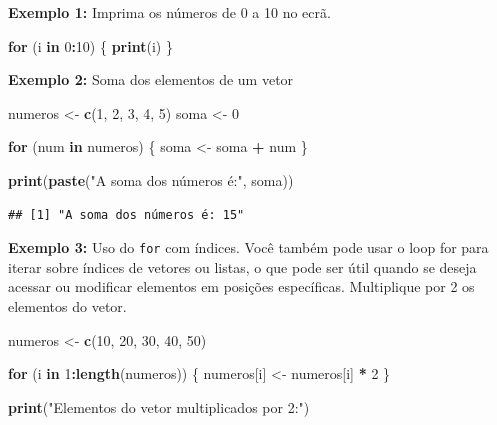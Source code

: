 \documentclass[
]{book}
\newenvironment{Shaded}{\begin{snugshade}}{\end{snugshade}}
\newcommand{\ControlFlowTok}[1]{\textcolor[rgb]{0.13,0.29,0.53}{\textbf{#1}}}
\newcommand{\DecValTok}[1]{\textcolor[rgb]{0.00,0.00,0.81}{#1}}
\newcommand{\FunctionTok}[1]{\textcolor[rgb]{0.13,0.29,0.53}{\textbf{#1}}}
\newcommand{\NormalTok}[1]{#1}
\newcommand{\OtherTok}[1]{\textcolor[rgb]{0.56,0.35,0.01}{#1}}
\newcommand{\SpecialCharTok}[1]{\textcolor[rgb]{0.81,0.36,0.00}{\textbf{#1}}}
\newcommand{\StringTok}[1]{\textcolor[rgb]{0.31,0.60,0.02}{#1}}
\begin{document}
\textbf{Exemplo 1:} Imprima os números de 0 a 10 no ecrã.

\begin{Shaded}
\begin{Highlighting}[]
\ControlFlowTok{for}\NormalTok{ (i }\ControlFlowTok{in} \DecValTok{0}\SpecialCharTok{:}\DecValTok{10}\NormalTok{) \{}
  \FunctionTok{print}\NormalTok{(i)}
\NormalTok{\}}
\end{Highlighting}
\end{Shaded}

\textbf{Exemplo 2:} Soma dos elementos de um vetor

\begin{Shaded}
\begin{Highlighting}[]
\NormalTok{numeros }\OtherTok{\textless{}{-}} \FunctionTok{c}\NormalTok{(}\DecValTok{1}\NormalTok{, }\DecValTok{2}\NormalTok{, }\DecValTok{3}\NormalTok{, }\DecValTok{4}\NormalTok{, }\DecValTok{5}\NormalTok{)}
\NormalTok{soma }\OtherTok{\textless{}{-}} \DecValTok{0}

\ControlFlowTok{for}\NormalTok{ (num }\ControlFlowTok{in}\NormalTok{ numeros) \{}
\NormalTok{  soma }\OtherTok{\textless{}{-}}\NormalTok{ soma }\SpecialCharTok{+}\NormalTok{ num}
\NormalTok{\}}

\FunctionTok{print}\NormalTok{(}\FunctionTok{paste}\NormalTok{(}\StringTok{"A soma dos números é:"}\NormalTok{, soma))}
\end{Highlighting}
\end{Shaded}

\begin{verbatim}
## [1] "A soma dos números é: 15"
\end{verbatim}

\textbf{Exemplo 3:} Uso do \texttt{for} com índices. Você também pode usar o loop for para iterar sobre índices de vetores ou listas, o que pode ser útil quando se deseja acessar ou modificar elementos em posições específicas. Multiplique por 2 os elementos do vetor.

\begin{Shaded}
\begin{Highlighting}[]
\NormalTok{numeros }\OtherTok{\textless{}{-}} \FunctionTok{c}\NormalTok{(}\DecValTok{10}\NormalTok{, }\DecValTok{20}\NormalTok{, }\DecValTok{30}\NormalTok{, }\DecValTok{40}\NormalTok{, }\DecValTok{50}\NormalTok{)}

\ControlFlowTok{for}\NormalTok{ (i }\ControlFlowTok{in} \DecValTok{1}\SpecialCharTok{:}\FunctionTok{length}\NormalTok{(numeros)) \{}
\NormalTok{  numeros[i] }\OtherTok{\textless{}{-}}\NormalTok{ numeros[i] }\SpecialCharTok{*} \DecValTok{2}
\NormalTok{\}}

\FunctionTok{print}\NormalTok{(}\StringTok{"Elementos do vetor multiplicados por 2:"}\NormalTok{)}
\end{Highlighting}
\end{Shaded}
\end{document}

